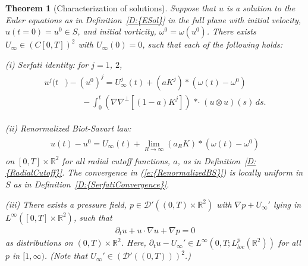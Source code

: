\documentclass[reqno,openright,11pt,twoside]{amsart}
\newtheorem{theorem}{Theorem}[section]
\theoremstyle{definition}
\numberwithin{equation}{section}
\begin{document}
\begin{theorem}[Characterization of solutions]\label{T:CharacterizationR2}
	Suppose that $u$ is a solution to the Euler equations as in
	{Definition~\ref{D:{ESol}}} in the full plane
	with initial velocity, $u(t = 0) = u^0 \in S$, and initial vorticity,
	$\omega^0 = \omega(u^0)$.
	There exists $U_{\ensuremath{\infty}} \in (C[0, T])^2$ with $U_{\ensuremath{\infty}}(0) = 0$,
	such that each of the following holds:
	
	\noindent
	(i) Serfati identity: for $j = 1$, $2$,
	\begin{align}\label{e:SerfatiId}
		\begin{split}
			u^j(t&) - (u^0)^j
				= U^j_{\ensuremath{\infty}}(t)
					+ (a K^j) *(\omega(t) - \omega^0) \\
				&\qquad- \int_0^t {\ensuremath{\left( {{\ensuremath{\nabla}} {\ensuremath{\nabla}}^\perp {\ensuremath{\left[ {(1 - a) K^j} \right]}}} \right) }}
				{\mathop{* \cdot}} (u \otimes u)(s)
							\, ds.
		\end{split}
	\end{align}
	
	\noindent
	(ii) Renormalized Biot-Savart law:
	\begin{align}\label{e:RenormalizedBS}
		\begin{split}
			u(t) - u^0
				= U_{\ensuremath{\infty}}(t)
					+ 
					\lim_{R \to {\ensuremath{\infty}}} (a_R K) *(\omega(t) - \omega^0)
		\end{split}
	\end{align}
	on $[0, T] \times {\ensuremath{{\ensuremath{\mathbb{{R}}}}}}^2$ for all radial cutoff
	functions, $a$, as in {Definition~\ref{D:{RadialCutoff}}}.
	The convergence in {(\ref{e:{RenormalizedBS}})}
	is locally uniform in $S$ as in {Definition~\ref{D:{SerfatiConvergence}}}.
	
	\noindent
	(iii) There exists
	a pressure field, $p \in {\ensuremath{\mathcal{{D}}}}'((0, T) \times {\ensuremath{{\ensuremath{\mathbb{{R}}}}}}^2)$
	with ${\ensuremath{\nabla}} p + U_{\ensuremath{\infty}}'$ lying
	in $L^{\ensuremath{\infty}}([0, T] \times {\ensuremath{{\ensuremath{\mathbb{{R}}}}}}^2)$, such that
    \begin{align}\label{e:VelocityEquationR2}
        {\ensuremath{\partial}}_t u + u \cdot {\ensuremath{\nabla}} u + {\ensuremath{\nabla}} p = 0  
    \end{align}
	as distributions on $(0, T) \times {\ensuremath{{\ensuremath{\mathbb{{R}}}}}}^2$. Here,
	${\ensuremath{\partial}}_t u - U_{\ensuremath{\infty}}'\in L^{\ensuremath{\infty}}(0, T; L^p_{loc}({\ensuremath{{\ensuremath{\mathbb{{R}}}}}}^2))$
	for all $p$ in $[1, {\ensuremath{\infty}})$.
	(Note that $U_{\ensuremath{\infty}}' \in ({\ensuremath{\mathcal{{D}}}}'((0, T)))^2$.)
	

\end{theorem}
\end{document}
